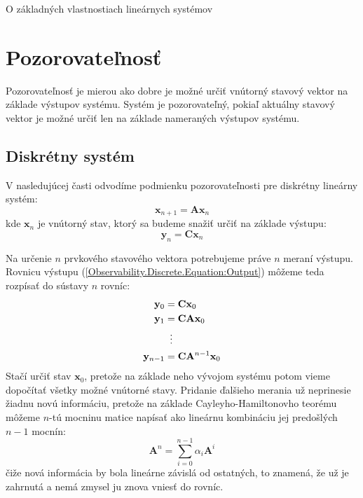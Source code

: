 \documentclass[a4paper, 10pt, ]{article}
\begin{document}
\begin{flushleft}
    O základných vlastnostiach lineárnych systémov
\end{flushleft}

\bigskip

\normalsize
\normalfont



\section{Pozorovateľnosť}

Pozorovateľnosť je mierou ako dobre je možné určiť vnútorný stavový vektor na základe výstupov systému. Systém je pozorovateľný, pokiaľ aktuálny stavový vektor je možné určiť len na základe nameraných výstupov systému. 


\subsection{Diskrétny systém}

V nasledujúcej časti odvodíme podmienku pozorovateľnosti pre diskrétny lineárny systém:
\begin{equation}
    \label{Observability.Discrete.Equation:StateSpaceModel}
    \bm{x}_{n + 1} = \bm{A} \bm{x}_{n}
\end{equation}
kde $\bm{x}_{n}$ je vnútorný stav, ktorý sa budeme snažiť určiť na základe výstupu:
\begin{equation}
    \label{Observability.Discrete.Equation:Output}
    \bm{y}_n = \bm{C} \bm{x}_{n}
\end{equation}

Na určenie $n$ prvkového stavového vektora potrebujeme práve $n$ meraní výstupu. Rovnicu výstupu (\ref{Observability.Discrete.Equation:Output}) môžeme teda rozpísať do sústavy $n$ rovníc:
\begin{subequations}
    \label{Observability.Discrete.Equation:OutputSystem}
    \begin{align}
        \bm{y}_0       &= \bm{C} \bm{x}_{0}                \\
        \bm{y}_1       &= \bm{C} \bm{A} \bm{x}_{0}         \\
        &\vdotswithin{=}                                   \\
        \bm{y}_{n - 1} &= \bm{C} \bm{A}^{n - 1} \bm{x}_{0}
    \end{align}
\end{subequations}
Stačí určiť stav $\bm{x}_0$, pretože na základe neho vývojom systému potom vieme dopočítať všetky možné vnútorné stavy. Pridanie ďalšieho merania už neprinesie žiadnu novú informáciu, pretože na základe Cayleyho-Hamiltonovho teorému môžeme $n$-tú mocninu matice napísať ako lineárnu kombináciu jej predošlých $n - 1$ mocnín:
\begin{equation}
    \bm{A}^n = \sum_{i = 0}^{n - 1} \alpha_{i} \bm{A}^{i}
\end{equation}
čiže nová informácia by bola lineárne závislá od ostatných, to znamená, že už je zahrnutá a nemá zmysel ju znova vniesť do rovníc.
\end{document}

